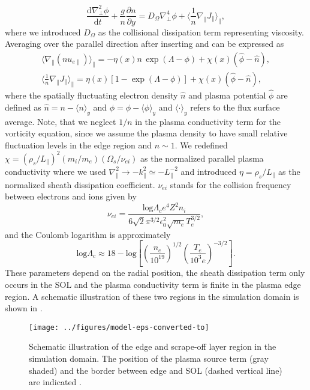 \begin{equation}
	\frac{\mathrm{d}\nabla_\perp^2 \phi}{\mathrm{d}t} + \frac{g}{n}\frac{\partial n}{\partial y} = D_{\Omega}\nabla_\perp^4 \phi + \Bigg \langle \frac{1}{n} \nabla_\parallel J_{\parallel} \Bigg \rangle_\parallel,
\end{equation}
where we introduced $D_{\Omega}$  as the collisional dissipation term representing viscosity. Averaging over the parallel direction after inserting  and  can be expressed as
\begin{subequations}
	\begin{gather}
		\Bigg \langle \nabla_\parallel \left(n{u}_{e\parallel} \right) \Bigg \rangle_\parallel = - \eta(x) n\,\exp(\Lambda-\phi) + \chi(x)( \widehat{\phi} - \widehat{n} ) ,
		\\
		\Bigg \langle \frac{1}{n} \nabla_\parallel J_{\parallel} \Bigg \rangle_\parallel =  \eta(x) \left[ 1-\exp(\Lambda-\phi) \right] + \chi(x)( \widehat{\phi} - \widehat{n} ),
	\end{gather}
\end{subequations}
where the spatially fluctuating electron density $\widehat{n}$ and plasma potential $\widehat{\phi}$ are defined as $\widehat{n}=n-\langle{n}\rangle_y$ and $\widehat{\phi}=\phi-\langle{\phi}\rangle_y$ and $\langle{\cdot}\rangle_y$ refers to the flux surface average. Note, that we neglect $1/n$ in the plasma conductivity term for the vorticity equation, since we assume the plasma density to have small relative fluctuation levels in the edge region and $n \sim 1$. We redefined $\chi = \left(\rho_s/L_\parallel\right)^2(m_i/m_e)(\Omega_s/\nu_{ei})$ as the normalized parallel plasma conductivity where we used $\nabla_\parallel^2 \rightarrow -k^2_\parallel\simeq-L_\parallel^{-2}$ and introduced $\eta=\rho_s/L_\parallel$ as the normalized sheath dissipation coefficient. $\nu_{ei}$ stands for the collision frequency between electrons and ions given by
\begin{equation}
	\nu_{ei} = \frac{\textrm{log}\Lambda_c e^4Z^2n_i}{6\sqrt{2}\pi^{3/2} \epsilon_0^2\sqrt{m_e}T_e^{3/2}},
\end{equation}
and the Coulomb logarithm is approximately \cite{militellobook}
\begin{equation}
	\textrm{log}\Lambda_c\approx 18 - \textrm{log}\left[\left(\frac{n_e}{10^{19}}\right)^{1/2}\left(\frac{T_e}{10^3e}\right)^{-3/2}\right].
\end{equation}
These parameters depend on the radial position, the sheath dissipation term only occurs in the SOL and the plasma conductivity term is finite in the plasma edge region. A schematic illustration of these two regions in the simulation domain is shown in .
\begin{figure}[t]
	\centering
	\texttt{[image: ../figures/model-eps-converted-to]}
	\caption{Schematic illustration of the edge and scrape-off layer region in the simulation domain. The position of the plasma
source term (gray shaded) and the border between edge and SOL (dashed vertical line) are indicated \cite{decristoforo2021numerical}.}
	\label{Fig:model}
\end{figure}

